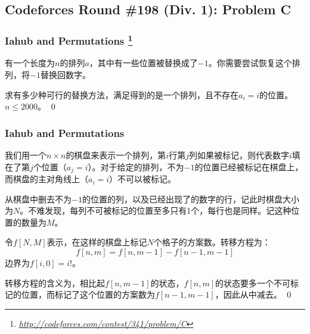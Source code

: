 \documentclass[9pt,dvipsnames,table]{beamer}
\newcommand{\hlink}[1]{
	\footnote{\fontsize{6pt}{\baselineskip}\href{#1}{\textsl{\underline{\url{#1}}}}}
}
\newenvironment{qedframe}{%
	\begin{frame}[environment=qedqedframe]%
	}{%
	\qed
	\end{frame}%
}
\begin{document}
\subsection{Codeforces Round \#198 (Div. 1): Problem C}
\begin{qedframe}
	\frametitle{Iahub and Permutations\hlink{http://codeforces.com/contest/341/problem/C}}
	有一个长度为$n$的排列$a$，其中有一些位置被替换成了$-1$。你需要尝试恢复这个排列，将$-1$替换回数字。
	
	求有多少种可行的替换方法，满足得到的是一个排列，且不存在$a_i=i$的位置。$n\leq 2000$。
\end{qedframe}
\begin{qedframe}
	\frametitle{Iahub and Permutations}
	我们用一个$n\times n$的棋盘来表示一个排列，第$i$行第$j$列如果被标记，则代表数字$i$填在了第$j$个位置（$a_j=i$）。对于给定的排列，不为$-1$的位置已经被标记在棋盘上，而棋盘的主对角线上（$a_i=i$）不可以被标记。\pause
	
	从棋盘中删去不为$-1$的位置的列，以及已经出现了的数字的行，记此时棋盘大小为$N$。不难发现，每列不可被标记的位置至多只有1个，每行也是同样。记这种位置的数量为$M$。\pause
	
	令$f[N,M]$表示，在这样的棋盘上标记$N$个格子的方案数。转移方程为：
	\[ f[n,m]=f[n,m-1]-f[n-1,m-1] \]
	边界为$f[i,0]=i!$。
	
	转移方程的含义为，相比起$f[n,m-1]$的状态，$f[n,m]$的状态要多一个不可标记的位置，而标记了这个位置的方案数为$f[n-1,m-1]$，因此从中减去。
\end{qedframe}
\end{document}
